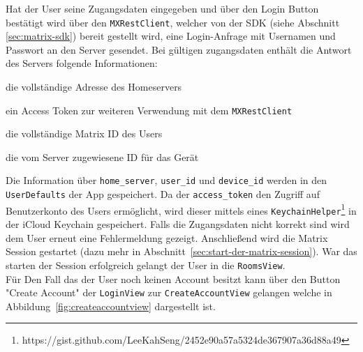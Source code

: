     Hat der User seine Zugangsdaten eingegeben und über den Login Button bestätigt wird über den \texttt{MXRestClient}, welcher von der SDK (siehe Abschnitt \ref{sec:matrix-sdk}) bereit gestellt wird, eine Login-Anfrage mit Usernamen und Passwort an den Server gesendet.
    Bei gültigen zugangsdaten enthält die Antwort des Servers folgende Informationen:
    \begin{description}[leftmargin=!,labelwidth=3cm]
        \item [home\_server] die vollständige Adresse des Homeservers
        \item [access\_token] ein Access Token zur weiteren Verwendung mit dem \texttt{MXRestClient}
        \item [user\_id] die vollständige Matrix ID des Users
        \item [device\_id] die vom Server zugewiesene ID für das Gerät
    \end{description}
    Die Information über \texttt{home\_server}, \texttt{user\_id} und \texttt{device\_id} werden in den \texttt{UserDefaults} der App gespeichert.
    Da der \texttt{access\_token} den Zugriff auf Benutzerkonto des Users ermöglicht, wird dieser mittels eines \texttt{KeychainHelper}\footnote{https://gist.github.com/LeeKahSeng/2452e90a57a5324de367907a36d88a49} in der iCloud Keychain gespeichert.
    Falls die Zugangsdaten nicht korrekt sind wird dem User erneut eine Fehlermeldung gezeigt.
    Anschließend wird die Matrix Session gestartet (dazu mehr in Abschnitt~\ref{sec:start-der-matrix-session}).
    War das starten der Session erfolgreich gelangt der User in die \texttt{RoomsView}.\\

    Für Den Fall das der User noch keinen Account besitzt kann über den Button "Create Account" der \texttt{LoginView} zur \texttt{CreateAccountView} gelangen welche in Abbildung~\ref{fig:createaccountview} dargestellt ist.





